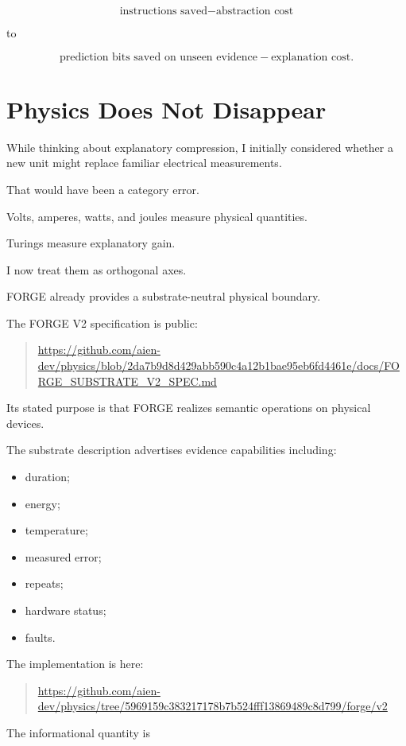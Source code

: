\documentclass[11pt]{article}
\begin{document}
\[
\text{instructions saved}
-
\text{abstraction cost}
\]

to

\[
\text{prediction bits saved on unseen evidence}
-
\text{explanation cost}.
\]

\section{Physics Does Not Disappear}

While thinking about explanatory compression, I initially considered whether a new unit might replace familiar electrical measurements.

That would have been a category error.

Volts, amperes, watts, and joules measure physical quantities.

Turings measure explanatory gain.

I now treat them as orthogonal axes.

FORGE already provides a substrate-neutral physical boundary.

The FORGE V2 specification is public:

\begin{quote}
\url{https://github.com/aien-dev/physics/blob/2da7b9d8d429abb590c4a12b1bae95eb6fd4461e/docs/FORGE_SUBSTRATE_V2_SPEC.md}
\end{quote}

Its stated purpose is that FORGE realizes semantic operations on physical devices.

The substrate description advertises evidence capabilities including:

\begin{itemize}
    \item duration;
    \item energy;
    \item temperature;
    \item measured error;
    \item repeats;
    \item hardware status;
    \item faults.
\end{itemize}

The implementation is here:

\begin{quote}
\url{https://github.com/aien-dev/physics/tree/5969159c383217178b7b524fff13869489c8d799/forge/v2}
\end{quote}

The informational quantity is
\end{document}
